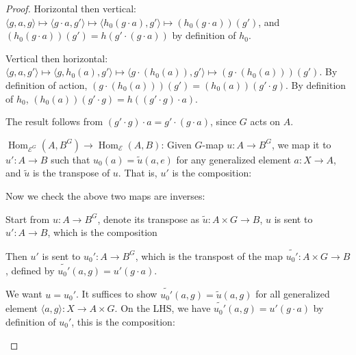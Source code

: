 \documentclass[a4paper]{article}
\DeclareMathOperator{\Hom}{\text {Hom}}
\DeclareMathOperator{\E}{\mathcal E}
\begin{document}
\begin{proof}
    Horizontal then vertical: $\langle g,a,g\rangle\mapsto \langle g\cdot a,g'\rangle \mapsto \langle h_0(g\cdot a),g'\rangle\mapsto (h_0(g\cdot a))(g')$, and $(h_0(g\cdot a))(g') = h(g'\cdot (g\cdot a))$ by definition of $h_0$.

    Vertical then horizontal: $\langle g,a,g'\rangle \mapsto \langle g,h_0(a),g'\rangle\mapsto \langle g\cdot (h_0(a)),g'\rangle\mapsto (g\cdot (h_0(a)))(g')$. By definition of action, $(g\cdot (h_0(a)))(g') = (h_0(a))(g'\cdot g)$. By definition of $h_0$, $(h_0(a))(g'\cdot g) = h((g'\cdot g)\cdot a)$. 
    
    The result follows from $(g'\cdot g)\cdot a = g'\cdot (g\cdot a)$, since $G$ acts on $A$.

    $\Hom_{\E^G}(A,B^G)\to \Hom_{\E}(A,B)$: Given $G$-map $u:A\to B^G$, we map it to $u':A\to B$ such that $u_0(a)=\tilde{u}(a,e)$ for any generalized element $a:X\to A$, and $\tilde{u}$ is the transpose of $u$. That is, $u'$ is the composition:
    \begin{center}
    \end{center} 

    Now we check the above two maps are inverses:

    Start from $u:A\to B^G$, denote its transpose as $\tilde{u}:A\times G\to B$, $u$ is sent to $u':A\to B$, which is the composition
    \begin{center}
    \end{center} 

    Then $u'$ is sent to $u_0':A\to B^G$, which is the transpost of the map $\tilde{u_0'}:A\times G\to B$, defined by $\tilde{u_0'}(a,g)=u'(g\cdot a)$.

    We want $u=u_0'$. It suffices to show $\tilde{u_0'}(a,g)=\tilde{u}(a,g)$ for all generalized element $\langle a,g\rangle: X\to A\times G$. On the LHS, we have $\tilde{u_0'}(a,g)=u'(g\cdot a)$ by definition of $u_0'$, this is the composition:

    \begin{center}
    \end{center}


\end{proof}
\end{document}
